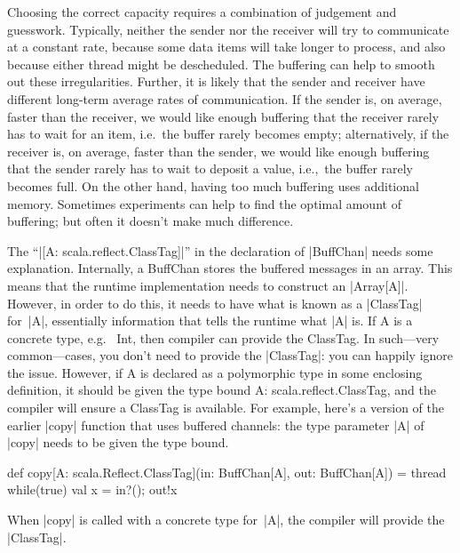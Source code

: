 Choosing the correct capacity requires a combination of judgement and
guesswork.  Typically, neither the sender nor the receiver will try to
communicate at a constant rate, because some data items will take longer to
process, and also because either thread might be descheduled.  The buffering
can help to smooth out these irregularities.  Further, it is likely that the
sender and receiver have different long-term average rates of communication.
If the sender is, on average, faster than the receiver, we would like enough
buffering that the receiver rarely has to wait for an item, i.e.~the buffer
rarely becomes empty; alternatively, if the receiver is, on average, faster
than the sender, we would like enough buffering that the sender rarely has to
wait to deposit a value, i.e.,~the buffer rarely becomes full.  On the other
hand, having too much buffering uses additional memory.  Sometimes experiments
can help to find the optimal amount of buffering; but often it doesn't make
much difference.  

The ``|[A: scala.reflect.ClassTag]|'' in the declaration of |BuffChan| needs
some explanation. Internally, a {\scalashape BuffChan} stores the buffered
messages in an array.  This means that the runtime implementation needs to
construct an |Array[A]|.  However, in order to do this, it needs to have what
is known as a |ClassTag| for~|A|, essentially information that tells the
runtime what |A| is.  If {\scalashape A} is a concrete type, e.g.~{\scalashape
  Int}, then compiler can provide the {\scalashape ClassTag}.  In such---very
common---cases, you don't need to provide the |ClassTag|: you can happily
ignore the issue.  However, if {\scalashape A} is declared as a polymorphic
type in some enclosing definition, it should be given the type bound
{\scalashape A: scala.reflect.ClassTag}, and the compiler will ensure a
{\scalashape ClassTag} is available.  For example, here's a version of the
earlier |copy| function that uses buffered channels: the type parameter |A| of
|copy| needs to be given the type bound.
%
\begin{scala}
  def copy[A: scala.Reflect.ClassTag](in: BuffChan[A], out: BuffChan[A]) = thread{
    while(true){ val x = in?(); out!x }
  }
\end{scala}
%
When |copy| is called with a concrete type for~|A|, the compiler will provide
the |ClassTag|.


